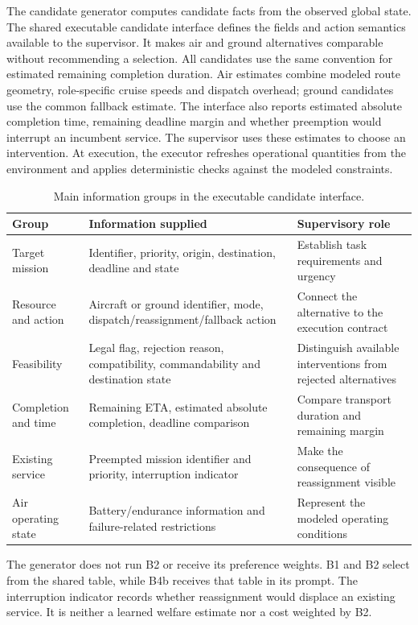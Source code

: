\documentclass[]{interact}
\theoremstyle{plain}
\theoremstyle{definition}
\theoremstyle{remark}
\begin{document}
The candidate generator computes candidate facts from the observed global state. The shared executable candidate interface defines the fields and action semantics available to the supervisor. It makes air and ground alternatives comparable without recommending a selection. All candidates use the same convention for estimated remaining completion duration. Air estimates combine modeled route geometry, role-specific cruise speeds and dispatch overhead; ground candidates use the common fallback estimate. The interface also reports estimated absolute completion time, remaining deadline margin and whether preemption would interrupt an incumbent service. The supervisor uses these estimates to choose an intervention. At execution, the executor refreshes operational quantities from the environment and applies deterministic checks against the modeled constraints.

\begin{table}[!htbp]
\centering
\small
\setlength{\tabcolsep}{3pt}
\caption{Main information groups in the executable candidate interface.}
\label{tab:table1}
\begin{tabularx}{\textwidth}{@{}lYY@{}}
\toprule
Group & Information supplied & Supervisory role \\
\midrule
Target mission & Identifier, priority, origin, destination, deadline and state & Establish task requirements and urgency \\
Resource and action & Aircraft or ground identifier, mode, dispatch/reassignment/fallback action & Connect the alternative to the execution contract \\
Feasibility & Legal flag, rejection reason, compatibility, commandability and destination state & Distinguish available interventions from rejected alternatives \\
Completion and time & Remaining ETA, estimated absolute completion, deadline comparison & Compare transport duration and remaining margin \\
Existing service & Preempted mission identifier and priority, interruption indicator & Make the consequence of reassignment visible \\
Air operating state & Battery/endurance information and failure-related restrictions & Represent the modeled operating conditions \\
\bottomrule
\end{tabularx}
\end{table}

The generator does not run B2 or receive its preference weights. B1 and B2 select from the shared table, while B4b receives that table in its prompt. The interruption indicator records whether reassignment would displace an existing service. It is neither a learned welfare estimate nor a cost weighted by B2.
\end{document}

